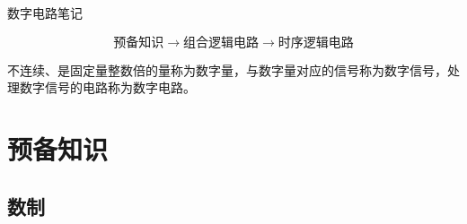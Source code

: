 \documentclass[UTF8,fontset=fandol,zihao=5]{ctexart}
\begin{document}
\begin{center}
  {\heiti\headingfont{}\color{main} 数字电路笔记}
\end{center}

\vspace{0.45em}

\begin{relationbox}
\[
  \boxed{\text{预备知识}}
  \longrightarrow
  \boxed{\text{组合逻辑电路}}
  \longrightarrow
  \boxed{\text{时序逻辑电路}}
\]
\end{relationbox}

不连续、是固定量整数倍的量称为数字量，与数字量对应的信号称为数字信号，处理数字信号的电路称为数字电路。

\section{预备知识}

\subsection{数制}
\end{document}

